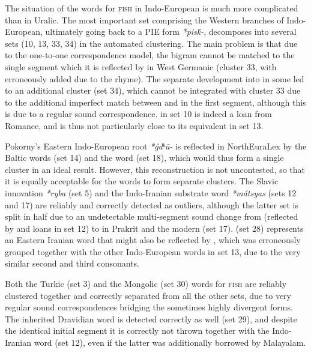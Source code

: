 The situation of the words for \textsc{fish} in Indo-European is much more complicated than in Uralic. The most important set comprising the Western branches of Indo-European, ultimately going back to a PIE form \textit{*pis\'{k}-}, decomposes into several sets (10, 13, 33, 34) in the automated clustering. The main problem is that due to the one-to-one correspondence model, the bigram \ipa{[sk]} cannot be matched to the single segment \ipa{[S]} which it is reflected by in West Germanic (cluster 33, with  \ipa{[jiC]} erroneously added due to the rhyme). The separate development into \ipa{[S]} in some  led to an additional cluster (set 34), which cannot be integrated with cluster 33 due to the additional imperfect match between \ipa{[p]} and \ipa{[f]} in the first segment, although this is due to a regular sound correspondence.  \ipa{[p@sgOd]} in set 10 is indeed a loan from Romance, and is thus not particularly close to its  
equivalent \ipa{[I@s\super Gk]} in set 13.

Pokorny's Eastern Indo-European root \textit{*\'{g}dʰ\={u}-} is reflected in NorthEuraLex by the Baltic words (set 14) and the  word (set 18), which would thus form a single cluster in an ideal result. However, this reconstruction is not uncontested, so that it is equally acceptable for the words to form separate clusters. The Slavic innovation \textit{*ryba} (set 5) and the Indo-Iranian substrate word \textit{*m\'{a}tsyas} (sets 12 and 17) are reliably and correctly detected as outliers, although the latter set is split in half due to an undetectable multi-segment sound change from  \ipa{[tsj]} (reflected by  and  loans in set 12) to \ipa{[\t{tS}\super h]} in Prakrit and the modern  (set 17).  \ipa{[kab]} (set 28) represents an Eastern Iranian word that might also be reflected by  \ipa{[k@sag]}, which was erroneously 
grouped together with the other Indo-European words in set 13, due to the very similar second and third consonants.

Both the Turkic (set 3) and the Mongolic (set 30) words for \textsc{fish} are reliably clustered together and correctly separated from all the other sets, due to very regular sound correspondences bridging the sometimes highly divergent forms. The inherited Dravidian word is detected correctly as well (set 29), and despite the identical initial segment it is correctly not thrown together with the Indo-Iranian word (set 12), even if the latter was additionally borrowed by Malayalam.

